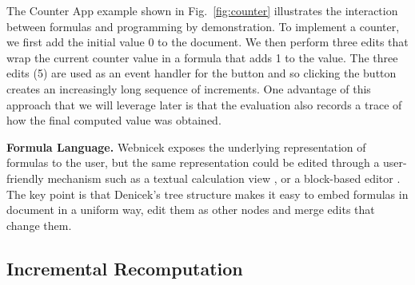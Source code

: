 \documentclass[sigconf]{acmart}
\newcommand{\note}[1]{}
\DeclareRobustCommand{\keyideabox}[3]
{\vspace{\dimexpr\baselineskip\relax} \noindent\colorbox{gray!20}{
\parbox{\dimexpr\columnwidth-\marginparsep+1pt\relax}
{\small {#1} \textbf{#2.} #3}
}}
\begin{document}
%

The Counter App example shown in Fig.~\ref{fig:counter} illustrates the interaction between formulas
and programming by demonstration. To implement a counter, we first add the initial value 0 to the
document. We then perform three edits that wrap the current counter value in a formula that adds
1 to the value. The three edits (5) are used as an event handler for the button and so clicking the
button creates an increasingly long sequence of increments. One advantage of this approach that
we will leverage later is that the evaluation also records a trace of how the final computed value
was obtained.


\keyideabox{\faSuperscript}{Formula Language}{
Webnicek exposes the underlying representation of formulas to the user, but the same representation
could be edited through a user-friendly mechanism such as a textual calculation view \cite{sarkar-2018-calc},
or a block-based editor \cite{jansen-2019-xlblocks}. The key point
is that Denicek's tree structure makes it easy to embed formulas in document in a uniform
way, edit them as other nodes and merge edits that change them.}


\subsection{Incremental Recomputation}
\label{sec:impl-incremental}
\end{document}
